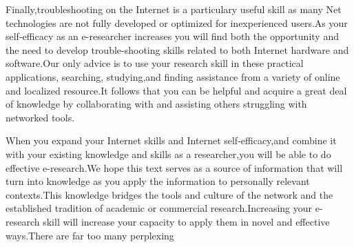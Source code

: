 \documentclass[10pt,a4paper]{book}
\begin{document}
Finally,troubleshooting on the Internet is a particulary useful skill as many Net technologies are not fully developed or optimized for inexperienced users.As your self-efficacy as an e-researcher increases you will find both the opportunity and the need to develop trouble-shooting skills related to both Internet hardware and software.Our only advice is to use your research skill in these practical applications, searching, studying,and finding assistance from a variety of online and localized resource.It follows that you can be helpful and acquire a great deal of knowledge by collaborating with and assisting others struggling with networked tools.

When you expand your Internet skills and Internet self-efficacy,and combine it with your existing knowledge and skills as a researcher,you will be able to do effective e-research.We hope this text serves as a source of information that will turn into knowledge as you apply the information to personally relevant contexts.This knowledge bridges the tools and culture of the network and the established tradition of academic or commercial research.Increasing your e-research skill will increase your capacity to apply them in novel and effective ways.\small There are far too many perplexing
\end{document}
